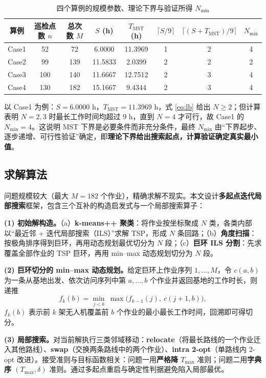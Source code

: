 \documentclass[12pt,a4paper]{ctexart}
\begin{document}
\begin{table}[H]
  \centering
  \caption{四个算例的规模参数、理论下界与验证所得 $N_{\min}$}
  \label{tab:nmin}
  \small
  \begin{tabular}{cccccccc}
    \toprule
    算例 & 巡检点数 $n$ & 总次数 $M$ & $S$ (h) & $T_{\mathrm{MST}}$ (h) & $\lceil S/9\rceil$ & $\lceil(S+T_{\mathrm{MST}})/9\rceil$ & $N_{\min}$ \\
    \midrule
    Case1 & 52 & 72 & 6.0000 & 11.3969 & 1 & 2 & 4 \\
    Case2 & 99 & 139 & 11.5833 & 2.0399 & 2 & 2 & 2 \\
    Case3 & 100 & 140 & 11.6667 & 12.7512 & 2 & 3 & 4 \\
    Case4 & 130 & 182 & 15.1667 & 9.4344 & 2 & 3 & 4 \\
    \bottomrule
  \end{tabular}
\end{table}

以 Case1 为例：$S=6.0000$ h，$T_{\mathrm{MST}}=11.3969$ h，式 \eqref{eq:lb} 给出 $N\ge 2$；但计算表明 $N=2,3$ 时最长工作时间均超过 9 h，直到 $N=4$ 才可行，故 Case1 的 $N_{\min}=4$。这说明 MST 下界是必要条件而非充分条件，最终 $N_{\min}$ 由``下界起步、逐步递增、可行性验证''确定，即\textbf{理论下界给出搜索起点，计算验证确定真实最小值}。

\subsection{求解算法}

问题规模较大（最大 $M=182$ 个作业），精确求解不现实。本文设计\textbf{多起点迭代局部搜索}框架，包含三个互补的构造启发式与一个局部搜索算子：

\textbf{(1) 初始解构造。}（a）\textbf{k-means++ 聚类}：将作业按坐标聚成 $N$ 类，各类内部以``最近邻 + 迭代局部搜索（ILS）''求解 TSP，形成 $N$ 条回路；（b）\textbf{角度扫描}：按极角排序得到巨环，再用动态规划最优切分为 $N$ 段；（c）\textbf{巨环 ILS 分割}：先求覆盖全部作业的 TSP 巨环，再用 min--max 动态规划切分为 $N$ 段。

\textbf{(2) 巨环切分的 min--max 动态规划。}给定巨环上作业序列 $1,\dots,M$，令 $c(a,b)$ 为一条从基地出发、依次访问序列中第 $a,\dots,b$ 个作业并返回基地的工作时长，则递推
\begin{equation}
  f_k(b)=\min_{j<b}\ \max\big(f_{k-1}(j),\ c(j+1,b)\big),
\end{equation}
$f_k(b)$ 表示前 $k$ 架无人机覆盖前 $b$ 个作业的最小最长工作时间，回溯即可得切分。

\textbf{(3) 局部搜索。}对当前解执行三类邻域移动：\textbf{relocate}（将最长路线的一个作业迁入其他路线）、\textbf{swap}（交换两条路线中的两个作业）、\textbf{intra 2-opt}（单路线内 2-opt 改进）。接受准则与目标函数相关：问题一用\textbf{严格降 $T_{\max}$} 准则；问题二用\textbf{字典序 $(T_{\max},\delta)$} 准则。通过多起点重启与确定性判据避免陷入局部最优。
\end{document}
